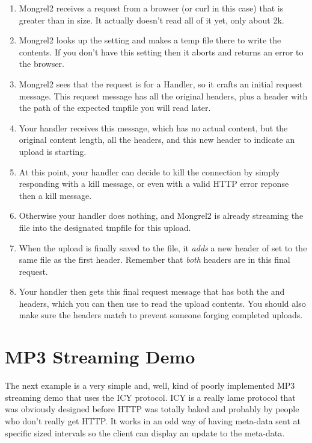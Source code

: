 \begin{enumerate}
\item Mongrel2 receives a request from a browser (or curl in this case) that is greater than  in size.  It actually doesn't read all of it yet, only about 2k.
\item Mongrel2 looks up the  setting and makes a temp file there to write the contents.  If you don't have this setting then it aborts and returns an error to the browser.
\item Mongrel2 sees that the request is for a Handler, so it crafts an initial request message.  This request message has all the original headers, plus a  header with the path of the expected tmpfile you will read later.
\item Your handler receives this message, which has no actual content, but the original content length, all the headers, and this new header to indicate an upload is starting.
\item At this point, your handler can decide to kill the connection by simply responding with a kill message, or even with a valid HTTP error reponse then a kill message.
\item Otherwise your handler does nothing, and Mongrel2 is already streaming the file into the designated tmpfile for this upload.
\item When the upload is finally saved to the file, it \emph{adds} a new header of  set to the same file as the first header.  Remember that \emph{both} headers are in this final request.
\item Your handler then gets this final request message that has both the  and  headers, which you can then use to read the upload contents.  You should also make sure the headers match to prevent someone forging completed uploads.
\end{enumerate}


\section{MP3 Streaming Demo}

The next example is a very simple and, well, kind of poorly implemented
MP3 streaming demo that uses the ICY protocol.  ICY is a really lame
protocol that was obviously designed before HTTP was totally baked
and probably by people who don't really get HTTP.  It works in an odd
way of having meta-data sent at specific sized intervals so the
client can display an update to the meta-data.

